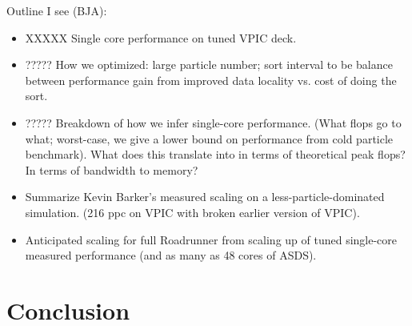 \documentclass[letter,10pt]{article}
\begin{document}
Outline I see (BJA):  
\begin{itemize}
\item XXXXX Single core performance on tuned VPIC deck.

\item ????? How we optimized:  large particle number; sort interval to be 
balance between performance gain from improved data locality vs. 
cost of doing the sort. 

\item ????? Breakdown of how we infer single-core performance.  (What flops go to 
what; worst-case, we give a lower bound on performance from cold particle
benchmark).  What does this translate into in terms of theoretical peak 
flops?  In terms of bandwidth to memory? 

\item Summarize Kevin Barker's measured scaling on a less-particle-dominated 
simulation.  (216 ppc on VPIC with broken earlier version of VPIC). 

\item Anticipated scaling for full Roadrunner from scaling up of tuned 
single-core measured performance (and as many as 48 cores of ASDS).  

\end{itemize}

\section*{Conclusion}






\begin{singlespace}


\end{singlespace}

\end{document}
